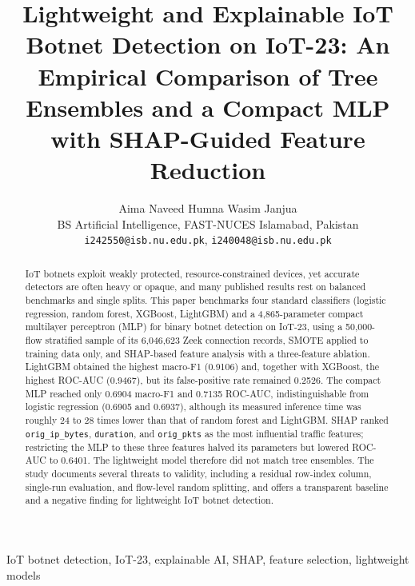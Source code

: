 \title{Lightweight and Explainable IoT Botnet Detection on IoT-23: An Empirical Comparison of Tree Ensembles and a Compact MLP with SHAP-Guided Feature Reduction}

\author{Aima Naveed  \qquad Humna Wasim Janjua \\
\normalsize BS Artificial Intelligence, FAST-NUCES Islamabad, Pakistan\\
\normalsize \texttt{i242550@isb.nu.edu.pk}, \texttt{i240048@isb.nu.edu.pk}}


\maketitle

\begin{abstract}
IoT botnets exploit weakly protected, resource-constrained devices, yet accurate detectors are often heavy or opaque, and many published results rest on balanced benchmarks and single splits. This paper benchmarks four standard classifiers (logistic regression, random forest, XGBoost, LightGBM) and a 4,865-parameter compact multilayer perceptron (MLP) for binary botnet detection on IoT-23, using a 50,000-flow stratified sample of its 6,046,623 Zeek connection records, SMOTE applied to training data only, and SHAP-based feature analysis with a three-feature ablation. LightGBM obtained the highest macro-F1 (0.9106) and, together with XGBoost, the highest ROC-AUC (0.9467), but its false-positive rate remained 0.2526. The compact MLP reached only 0.6904 macro-F1 and 0.7135 ROC-AUC, indistinguishable from logistic regression (0.6905 and 0.6937), although its measured inference time was roughly 24 to 28 times lower than that of random forest and LightGBM. SHAP ranked \texttt{orig\_ip\_bytes}, \texttt{duration}, and \texttt{orig\_pkts} as the most influential traffic features; restricting the MLP to these three features halved its parameters but lowered ROC-AUC to 0.6401. The lightweight model therefore did not match tree ensembles. The study documents several threats to validity, including a residual row-index column, single-run evaluation, and flow-level random splitting, and offers a transparent baseline and a negative finding for lightweight IoT botnet detection.
\end{abstract}

\begin{IEEEkeywords}
IoT botnet detection, IoT-23, explainable AI, SHAP, feature selection, lightweight models
\end{IEEEkeywords}